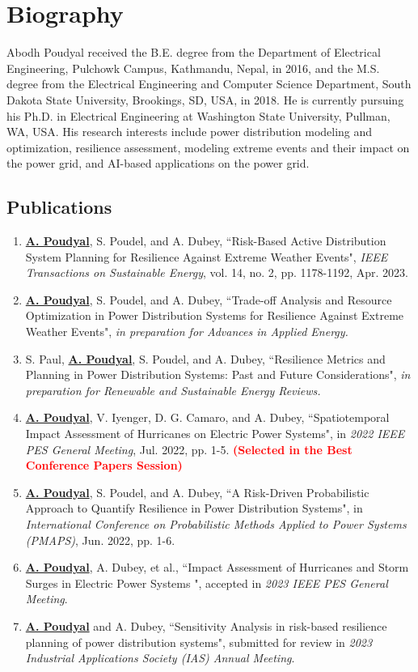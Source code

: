 \section{Biography}
\small
Abodh Poudyal received the B.E. degree from the Department of Electrical Engineering, Pulchowk Campus, Kathmandu, Nepal, in 2016, and the M.S. degree from the Electrical Engineering and Computer Science Department, South Dakota State University, Brookings, SD, USA, in 2018. He is currently pursuing his Ph.D. in Electrical Engineering at Washington State University, Pullman, WA, USA. His research interests include power distribution modeling and optimization, resilience assessment, modeling extreme events and their impact on the power grid, and AI-based applications on the power grid.
\singlespacing

\subsection{Publications}
\small
\begin{enumerate}
    \item {\textbf{\underline{A. Poudyal}}, S. Poudel, and A. Dubey, ``Risk-Based Active Distribution System Planning for Resilience Against Extreme Weather Events", \textit{IEEE Transactions on Sustainable Energy}, vol. 14, no. 2, pp. 1178-1192, Apr. 2023.}
    \item \textbf{\underline{A. Poudyal}}, S. Poudel, and A. Dubey, ``Trade-off Analysis and Resource Optimization in Power Distribution Systems for Resilience Against Extreme Weather Events", \textit{in preparation for Advances in Applied Energy.}
    \item S. Paul, \textbf{\underline{A. Poudyal}}, S. Poudel, and A. Dubey, ``Resilience Metrics and Planning in Power Distribution Systems: Past and Future Considerations", \textit{in preparation for Renewable and Sustainable Energy Reviews.}
    \item {\textbf{\underline{A. Poudyal}}, V. Iyenger, D. G. Camaro, and A. Dubey, ``Spatiotemporal Impact Assessment of Hurricanes on Electric Power Systems", in \textit{2022 IEEE PES General Meeting}, Jul. 2022, pp. 1-5. \textcolor{red}{\textbf{(Selected in the Best Conference Papers Session)}}}
    
    \item {\textbf{\underline{A. Poudyal}}, S. Poudel, and A. Dubey, ``A Risk-Driven Probabilistic Approach to Quantify Resilience in Power Distribution Systems", in \textit{International Conference on Probabilistic Methods Applied to Power Systems (PMAPS)}, Jun. 2022, pp. 1-6.}
    
    \item \textbf{\underline{A. Poudyal}}, A. Dubey, et al., ``Impact Assessment of Hurricanes and Storm Surges in Electric Power Systems ", accepted in \textit{2023 IEEE PES General Meeting}.
    \item {\textbf{\underline{A. Poudyal}} and A. Dubey, ``Sensitivity Analysis in risk-based resilience planning of power distribution systems", submitted for review in \textit{2023 Industrial Applications Society (IAS) Annual Meeting}.}
\end{enumerate}

